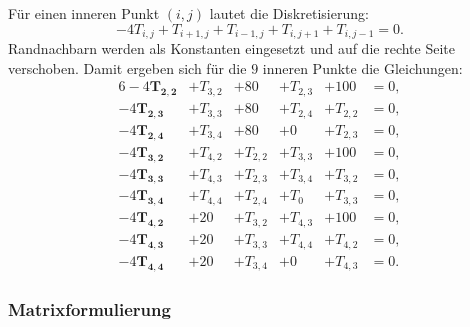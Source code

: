 Für einen inneren Punkt $(i,j)$ lautet die Diskretisierung:
\[
-4T_{i,j} + T_{i+1,j} + T_{i-1,j} + T_{i,j+1} + T_{i,j-1} = 0.
\]
Randnachbarn werden als Konstanten eingesetzt und auf die rechte Seite verschoben.
Damit ergeben sich für die $9$ inneren Punkte die Gleichungen:
\begin{alignat*}{6}
	-4\mathbf{T_{2,2}} &+ T_{3,2} &+ 80 &+ T_{2,3} &+ 100 &= 0, \\
	-4\mathbf{T_{2,3}} &+ T_{3,3} &+ 80 &+ T_{2,4} &+ T_{2,2} &= 0, \\
	-4\mathbf{T_{2,4}} &+ T_{3,4} &+ 80 &+ 0 &+ T_{2,3} &= 0, \\
	-4\mathbf{T_{3,2}} &+ T_{4,2} &+ T_{2,2} &+ T_{3,3} &+ 100 &= 0, \\
	-4\mathbf{T_{3,3}} &+ T_{4,3} &+ T_{2,3} &+ T_{3,4} &+ T_{3,2} &= 0, \\
	-4\mathbf{T_{3,4}} &+ T_{4,4} &+ T_{2,4} &+ T_0 &+ T_{3,3} &= 0, \\
	-4\mathbf{T_{4,2}} &+ 20 &+ T_{3,2} &+ T_{4,3} &+ 100 &= 0, \\
	-4\mathbf{T_{4,3}} &+ 20 &+ T_{3,3} &+ T_{4,4} &+ T_{4,2} &= 0, \\
	-4\mathbf{T_{4,4}} &+ 20 &+ T_{3,4} &+ 0 &+ T_{4,3} &= 0.
\end{alignat*}

\subsubsection*{Matrixformulierung}

